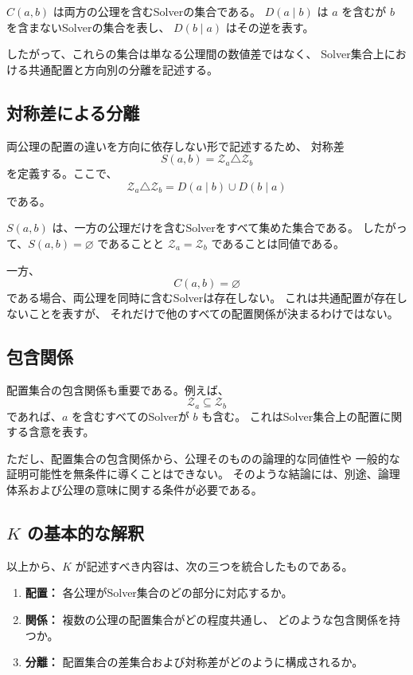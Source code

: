 \documentclass[a4paper,12pt]{article}
\begin{document}
$C(a,b)$ は両方の公理を含むSolverの集合である。
$D(a\mid b)$ は $a$ を含むが $b$ を含まないSolverの集合を表し、
$D(b\mid a)$ はその逆を表す。

したがって、これらの集合は単なる公理間の数値差ではなく、
Solver集合上における共通配置と方向別の分離を記述する。

\subsection{対称差による分離}

両公理の配置の違いを方向に依存しない形で記述するため、
対称差
\[
    S(a,b)
    =
    \mathcal{Z}_a\triangle\mathcal{Z}_b
\]
を定義する。ここで、
\[
    \mathcal{Z}_a\triangle\mathcal{Z}_b
    =
    D(a\mid b)\cup D(b\mid a)
\]
である。

$S(a,b)$ は、一方の公理だけを含むSolverをすべて集めた集合である。
したがって、$S(a,b)=\varnothing$ であることと
$\mathcal{Z}_a=\mathcal{Z}_b$ であることは同値である。

一方、
\[
    C(a,b)=\varnothing
\]
である場合、両公理を同時に含むSolverは存在しない。
これは共通配置が存在しないことを表すが、
それだけで他のすべての配置関係が決まるわけではない。

\subsection{包含関係}

配置集合の包含関係も重要である。例えば、
\[
    \mathcal{Z}_a\subseteq\mathcal{Z}_b
\]
であれば、$a$ を含むすべてのSolverが $b$ も含む。
これはSolver集合上の配置に関する含意を表す。

ただし、配置集合の包含関係から、公理そのものの論理的な同値性や
一般的な証明可能性を無条件に導くことはできない。
そのような結論には、別途、論理体系および公理の意味に関する条件が必要である。

\subsection{$K$ の基本的な解釈}

以上から、$K$ が記述すべき内容は、次の三つを統合したものである。

\begin{enumerate}[label=(\arabic*)]
    \item \textbf{配置：}
    各公理がSolver集合のどの部分に対応するか。
    \item \textbf{関係：}
    複数の公理の配置集合がどの程度共通し、
    どのような包含関係を持つか。
    \item \textbf{分離：}
    配置集合の差集合および対称差がどのように構成されるか。
\end{enumerate}
\end{document}

